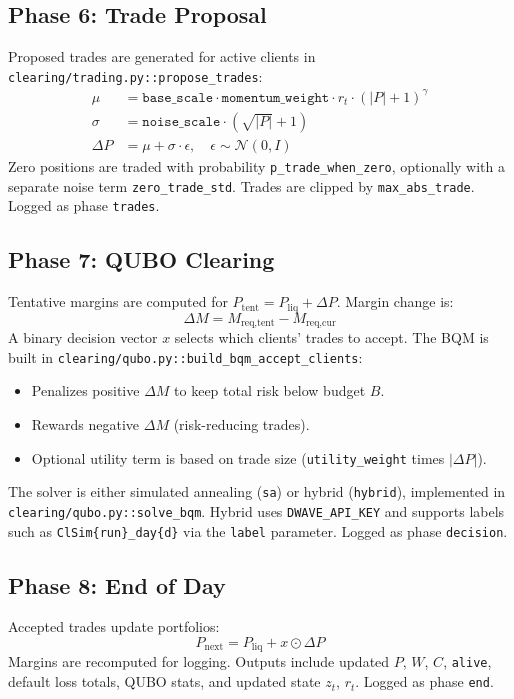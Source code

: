 \documentclass[11pt]{article}
\begin{document}
\subsection{Phase 6: Trade Proposal}
Proposed trades are generated for active clients in
\texttt{clearing/trading.py::propose\_trades}:
\begin{align*}
\mu &= \texttt{base\_scale} \cdot \texttt{momentum\_weight} \cdot r_t \cdot (|P|+1)^{\gamma} \\
\sigma &= \texttt{noise\_scale} \cdot (\sqrt{|P|} + 1) \\
\Delta P &= \mu + \sigma \cdot \epsilon,\quad \epsilon \sim \mathcal{N}(0, I)
\end{align*}
Zero positions are traded with probability \texttt{p\_trade\_when\_zero}, optionally
with a separate noise term \texttt{zero\_trade\_std}. Trades are clipped by
\texttt{max\_abs\_trade}. Logged as phase \texttt{trades}.

\subsection{Phase 7: QUBO Clearing}
Tentative margins are computed for $P_{\text{tent}} = P_{\text{liq}} + \Delta P$.
Margin change is:
\[
\Delta M = M_{\text{req,tent}} - M_{\text{req,cur}}
\]
A binary decision vector $x$ selects which clients' trades to accept.
The BQM is built in \texttt{clearing/qubo.py::build\_bqm\_accept\_clients}:
\begin{itemize}[leftmargin=*]
  \item Penalizes positive $\Delta M$ to keep total risk below budget $B$.
  \item Rewards negative $\Delta M$ (risk-reducing trades).
  \item Optional utility term is based on trade size
  (\texttt{utility\_weight} times $|\Delta P|$).
\end{itemize}
The solver is either simulated annealing (\texttt{sa}) or hybrid (\texttt{hybrid}),
implemented in \texttt{clearing/qubo.py::solve\_bqm}. Hybrid uses
\texttt{DWAVE\_API\_KEY} and supports labels such as \texttt{ClSim\{run\}\_day\{d\}}
via the \texttt{label} parameter. Logged as phase \texttt{decision}.

\subsection{Phase 8: End of Day}
Accepted trades update portfolios:
\[
P_{\text{next}} = P_{\text{liq}} + x \odot \Delta P
\]
Margins are recomputed for logging. Outputs include updated $P$, $W$, $C$,
\texttt{alive}, default loss totals, QUBO stats, and updated state $z_t$, $r_t$.
Logged as phase \texttt{end}.
\end{document}
